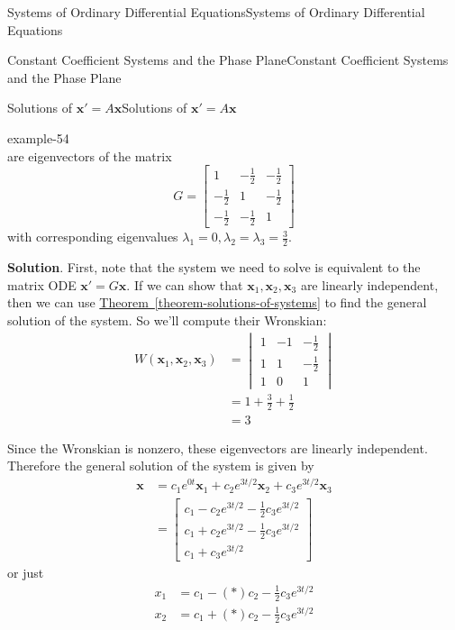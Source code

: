 \documentclass[10pt,]{book}
\numberwithin{equation}{section}
\renewcommand{\vec}[1]{\mathbf{#1}}
\newcommand{\parens}[1]{\left( #1 \right)}
\newcommand{\amp}{&}
\begin{document}
\begin{chapterptx}{Systems of Ordinary Differential Equations}{}{Systems of Ordinary Differential Equations}{}{}
\begin{sectionptx}{Constant Coefficient Systems and the Phase Plane}{}{Constant Coefficient Systems and the Phase Plane}{}{}
\begin{subsectionptx}{Solutions of \(\vec{x}' = A\vec{x}\)}{}{Solutions of \(\vec{x}' = A\vec{x}\)}{}{}
\begin{example}{}{example-54}
\begin{equation*}
\end{equation*}
are eigenvectors of the matrix%
\begin{equation*}
G = \begin{bmatrix}1 \amp  -\frac{1}{2}  \amp  -\frac{1}{2}\\-\frac{1}{2}  \amp  1 \amp  -\frac{1}{2} \\ -\frac{1}{2}  \amp  -\frac{1}{2}  \amp    1\end{bmatrix}
\end{equation*}
with corresponding eigenvalues \(\lambda_{1} = 0,\lambda_{2} = \lambda_{3} = \frac{3}{2}\).%
\par\smallskip%
\noindent\textbf{Solution}.\hypertarget{solution-51}{}\quad%
\hypertarget{p-328}{}%
First, note that the system we need to solve is equivalent to the matrix ODE \(\vec{x}' = G\vec{x}\). If we can show that \(\vec{x}_{1},\vec{x}_{2},\vec{x}_{3}\) are linearly independent, then we can use \hyperref[theorem-solutions-of-systems]{Theorem~\ref{theorem-solutions-of-systems}} to find the general solution of the system. So we'll compute their Wronskian:%
\begin{align*}
W(\vec{x}_{1},\vec{x}_{2},\vec{x}_{3}) \amp = \begin{vmatrix} 1  \amp  -1  \amp  -\frac{1}{2} \\ 1 \amp  1 \amp  -\frac{1}{2} \\ 1 \amp  0 \amp  1\end{vmatrix}\\
\amp = 1+\frac{3}{2}+\frac{1}{2}\\
\amp = 3
\end{align*}
%
\par
\hypertarget{p-329}{}%
Since the Wronskian is nonzero, these eigenvectors are linearly independent. Therefore the general solution of the system is given by%
\begin{align*}
\vec{x} \amp = c_{1}e^{0t}\vec{x}_{1}+c_{2}e^{3t/2}\vec{x}_{2}+c_{3}e^{3t/2}\vec{x}_{3}\\
\amp = \begin{bmatrix}c_{1}-c_{2}e^{3t/2}-\frac{1}{2}c_{3}e^{3t/2} \\ c_{1}+c_{2}e^{3t/2}-\frac{1}{2}c_{3}e^{3t/2} \\ c_{1}+c_{3}e^{3t/2}\end{bmatrix}
\end{align*}
or just%
\begin{align*}
x_{1} \amp = c_{1}-\parens*{c_{2}-\frac{1}{2}c_{3}}e^{3t/2}\\
x_{2} \amp = c_{1}+\parens*{c_{2}-\frac{1}{2}c_{3}}e^{3t/2}\\

\end{align*}
\end{example}
\end{subsectionptx}
\end{sectionptx}
\end{chapterptx}
\end{document}
